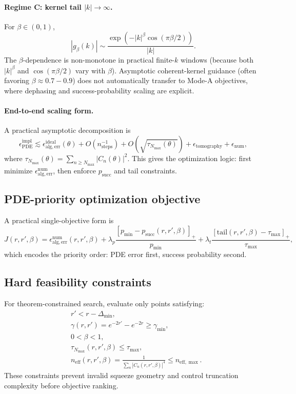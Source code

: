 \documentclass[11pt]{article}
\begin{document}
\paragraph{Regime C: kernel tail \(|k|\to\infty\).}
For \(\beta\in(0,1)\),
\[
|g_\beta(k)|\sim \frac{\exp\!\left(-|k|^\beta\cos(\pi\beta/2)\right)}{|k|}.
\]
The \(\beta\)-dependence is non-monotone in practical finite-\(k\) windows (because both \(|k|^\beta\) and
\(\cos(\pi\beta/2)\) vary with \(\beta\)). Asymptotic coherent-kernel guidance (often favoring \(\beta\approx 0.7\!-\!0.9\))
does not automatically transfer to Mode-A objectives, where dephasing and success-probability scaling are explicit.

\paragraph{End-to-end scaling form.}
A practical asymptotic decomposition is
\[
\epsilon_{\mathrm{PDE}}^{\mathrm{impl}}
\lesssim
\epsilon_{\mathrm{alg,err}}^{\mathrm{ideal}}(\theta)
+O(n_{\mathrm{steps}}^{-1})
+O\!\left(\sqrt{\tau_{N_{\max}}(\theta)}\right)
+\epsilon_{\mathrm{tomography}}
+\epsilon_{\mathrm{num}},
\]
where \(\tau_{N_{\max}}(\theta)=\sum_{n\ge N_{\max}}|C_n(\theta)|^2\).
This gives the optimization logic: first minimize \(\epsilon_{\mathrm{alg,err}}^{\mathrm{num}}\), then enforce \(p_{\mathrm{succ}}\) and tail constraints.

\subsection{PDE-priority optimization objective}
A practical single-objective form is
\begin{equation}
J(r,r',\beta)
=
\epsilon_{\mathrm{alg,err}}^{\mathrm{num}}(r,r',\beta)
+\lambda_p\frac{[p_{\min}-p_{\mathrm{succ}}(r,r',\beta)]_+}{p_{\min}}
+\lambda_t\frac{[\mathrm{tail}(r,r',\beta)-\tau_{\max}]_+}{\tau_{\max}},
\label{eq:objective_rrb}
\end{equation}
which encodes the priority order: PDE error first, success probability second.

\subsection{Hard feasibility constraints}
For theorem-constrained search, evaluate only points satisfying:
\begin{align}
&r' < r-\Delta_{\min}, \\
&\gamma(r,r')=e^{-2r'}-e^{-2r}\ge \gamma_{\min}, \\
&0<\beta<1, \\
&\tau_{N_{\max}}(r,r',\beta)\le \tau_{\max}, \\
&n_{\mathrm{eff}}(r,r',\beta)=\frac{1}{\sum_n |C_n(r,r',\beta)|^4}\le n_{\mathrm{eff},\max}.
\end{align}
These constraints prevent invalid squeeze geometry and control truncation complexity before objective ranking.
\end{document}

